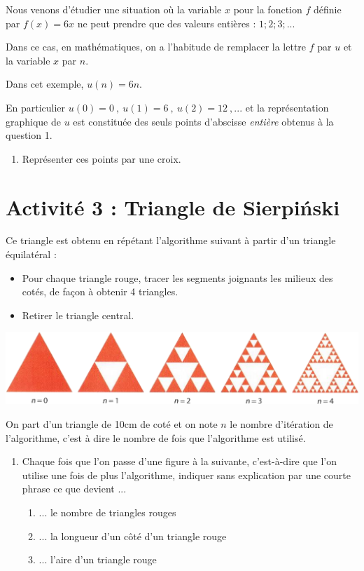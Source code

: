 Nous venons d'étudier une situation où la variable $x$ pour la fonction $f$ définie par $f(x)=6x$ ne peut prendre que des valeurs entières : $1 ; 2 ; 3; ...$

Dans ce cas, en mathématiques, on a l'habitude de remplacer la lettre $f$ par $u$ et la variable $x$ par $n$.

Dans cet exemple, $u(n)=6n$.

En particulier $u(0)=0~,~u(1)=6~,~u(2)=12~,...$ et la représentation graphique de $u$ est constituée des seuls points d'abscisse \textit{entière} obtenus à la question 1.

\begin{enumerate}[resume]
	\item Représenter ces points par une croix.
\end{enumerate}
\vspace*{0.7cm}
\section{Activité 3 : Triangle de Sierpiński}
Ce triangle est obtenu en répétant l'algorithme suivant à partir d'un triangle équilatéral :
\begin{itemize}[label=$\bullet$]
	\item Pour chaque triangle rouge, tracer les segments joignants les milieux des cotés, de façon à obtenir 4 triangles.
	\item Retirer le triangle central.
\end{itemize}
\begin{center}\includegraphics[width=18cm]{triangles.png}\end{center}
On part d'un triangle de 10cm de coté et on note $n$ le nombre d'itération de l'algorithme, c'est à dire le nombre de fois que l'algorithme est utilisé.

\begin{enumerate}
	\item Chaque fois que l'on passe d'une figure à la suivante, c'est-à-dire que l'on utilise une fois de plus l'algorithme, indiquer sans explication par une courte phrase ce que devient ...
		\begin{enumerate}
			\item ... le nombre de triangles rouges
			\item ... la longueur d'un côté d'un triangle rouge
			\item ... l'aire d'un triangle rouge
		\end{enumerate}
\end{enumerate}

